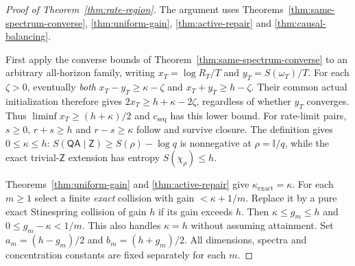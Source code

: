 \documentclass[11pt,a4paper]{article}
\numberwithin{equation}{section}
\theoremstyle{plain}
\theoremstyle{definition}
\newcommand{\rg}[1]{\mathsf{#1}}
\newcommand{\one}{\mathbb{I}}
\newcommand{\kexact}{\kappa_{\mathrm{exact}}}
\newcommand{\cseq}{c_{\mathrm{seq}}}
\begin{document}
\begin{proof}[Proof of Theorem~\ref{thm:rate-region}]
The argument uses Theorems~\ref{thm:same-spectrum-converse},
\ref{thm:uniform-gain}, \ref{thm:active-repair} and
\ref{thm:causal-balancing}.

First apply the converse bounds of Theorem~\ref{thm:same-spectrum-converse} to
an arbitrary all-horizon family, writing $x_T=\log R_T/T$ and
$y_T=S(\omega_T)/T$. For each $\zeta>0$, eventually \emph{both}
$x_T-y_T\ge\kappa-\zeta$ and $x_T+y_T\ge h-\zeta$. Their common actual
initialization therefore gives $2x_T\ge h+\kappa-2\zeta$, regardless of
whether $y_T$ converges. Thus $\liminf x_T\ge(h+\kappa)/2$ and $\cseq$ has
this lower bound. For rate-limit pairs, $s\ge 0$, $r+s\ge h$ and
$r-s\ge\kappa$ follow and survive closure. The definition gives
$0\le\kappa\le h$: $S(\rg{Q}\rg{A}\mid\rg{Z})\ge S(\rho)-\log q$ is
nonnegative at $\rho=\one/q$, while the exact trivial-$\rg{Z}$ extension has
entropy $S(\chi_\rho)\le h$.

Theorems~\ref{thm:uniform-gain} and \ref{thm:active-repair} give
$\kexact=\kappa$. For each $m\ge 1$ select a finite \emph{exact} collision
with gain $<\kappa+1/m$. Replace it by a pure exact Stinespring collision of
gain $h$ if its gain exceeds $h$. Then $\kappa\le g_m\le h$ and
$0\le g_m-\kappa<1/m$. This also handles $\kappa=h$ without assuming
attainment. Set $a_m=(h-g_m)/2$ and $b_m=(h+g_m)/2$. All dimensions, spectra
and concentration constants are fixed separately for each $m$.


\end{proof}
\end{document}
